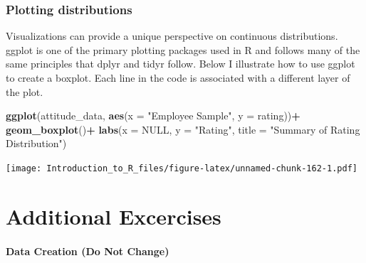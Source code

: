 \documentclass[]{book}
\newenvironment{Shaded}{\begin{snugshade}}{\end{snugshade}}
\newcommand{\DataTypeTok}[1]{\textcolor[rgb]{0.13,0.29,0.53}{#1}}
\newcommand{\KeywordTok}[1]{\textcolor[rgb]{0.13,0.29,0.53}{\textbf{#1}}}
\newcommand{\NormalTok}[1]{#1}
\newcommand{\OperatorTok}[1]{\textcolor[rgb]{0.81,0.36,0.00}{\textbf{#1}}}
\newcommand{\OtherTok}[1]{\textcolor[rgb]{0.56,0.35,0.01}{#1}}
\newcommand{\StringTok}[1]{\textcolor[rgb]{0.31,0.60,0.02}{#1}}
\theoremstyle{definition}
\theoremstyle{definition}
\theoremstyle{definition}
\theoremstyle{remark}
\begin{document}
\hypertarget{plotting-distributions}{%
\section{Plotting distributions}\label{plotting-distributions}}

Visualizations can provide a unique perspective on continuous distributions. ggplot is one of the primary plotting packages used in R and follows many of the same principles that dplyr and tidyr follow. Below I illustrate how to use ggplot to create a boxplot. Each line in the code is associated with a different layer of the plot.

\begin{Shaded}
\begin{Highlighting}[]
\KeywordTok{ggplot}\NormalTok{(attitude_data, }\KeywordTok{aes}\NormalTok{(}\DataTypeTok{x =} \StringTok{"Employee Sample"}\NormalTok{, }\DataTypeTok{y =}\NormalTok{ rating))}\OperatorTok{+}
\StringTok{  }\KeywordTok{geom_boxplot}\NormalTok{()}\OperatorTok{+}
\StringTok{  }\KeywordTok{labs}\NormalTok{(}\DataTypeTok{x =} \OtherTok{NULL}\NormalTok{, }\DataTypeTok{y =} \StringTok{"Rating"}\NormalTok{, }\DataTypeTok{title =} \StringTok{"Summary of Rating Distribution"}\NormalTok{)}
\end{Highlighting}
\end{Shaded}

\texttt{[image: Introduction\_to\_R\_files/figure-latex/unnamed-chunk-162-1.pdf]}

\hypertarget{part-additional-excercises}{%
\part{Additional Excercises}\label{part-additional-excercises}}

\hypertarget{data-creation-do-not-change}{%
\subsection{Data Creation (Do Not Change)}\label{data-creation-do-not-change}}
\end{document}
